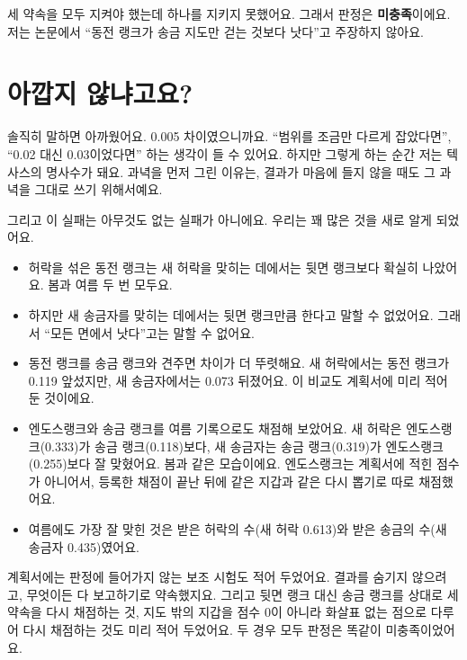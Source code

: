 세 약속을 모두 지켜야 했는데 하나를 지키지 못했어요.
그래서 판정은 \textbf{미충족}이에요.
저는 논문에서 “동전 랭크가 송금 지도만 걷는 것보다 낫다”고 주장하지 않아요.

\section{아깝지 않냐고요?}

솔직히 말하면 아까웠어요.
0.005 차이였으니까요.
“범위를 조금만 다르게 잡았다면”, “0.02 대신 0.03이었다면” 하는 생각이 들 수 있어요.
하지만 그렇게 하는 순간 저는 텍사스의 명사수가 돼요.
과녁을 먼저 그린 이유는, 결과가 마음에 들지 않을 때도 그 과녁을 그대로 쓰기 위해서예요.

그리고 이 실패는 아무것도 없는 실패가 아니에요.
우리는 꽤 많은 것을 새로 알게 되었어요.

\begin{itemize}
\item 허락을 섞은 동전 랭크는 새 허락을 맞히는 데에서는 뒷면 랭크보다 확실히 나았어요. 봄과 여름 두 번 모두요.
\item 하지만 새 송금자를 맞히는 데에서는 뒷면 랭크만큼 한다고 말할 수 없었어요. 그래서 “모든 면에서 낫다”고는 말할 수 없어요.
\item 동전 랭크를 송금 랭크와 견주면 차이가 더 뚜렷해요. 새 허락에서는 동전 랭크가 0.119 앞섰지만, 새 송금자에서는 0.073 뒤졌어요.
      이 비교도 계획서에 미리 적어 둔 것이에요.
\item 엔도스랭크와 송금 랭크를 여름 기록으로도 채점해 보았어요.
      새 허락은 엔도스랭크(0.333)가 송금 랭크(0.118)보다, 새 송금자는 송금 랭크(0.319)가 엔도스랭크(0.255)보다 잘 맞혔어요. 봄과 같은 모습이에요.
      엔도스랭크는 계획서에 적힌 점수가 아니어서, 등록한 채점이 끝난 뒤에 같은 지갑과 같은 다시 뽑기로 따로 채점했어요.
\item 여름에도 가장 잘 맞힌 것은 받은 허락의 수(새 허락 0.613)와 받은 송금의 수(새 송금자 0.435)였어요.
\end{itemize}

계획서에는 판정에 들어가지 않는 보조 시험도 적어 두었어요.
결과를 숨기지 않으려고, 무엇이든 다 보고하기로 약속했지요.
그리고 뒷면 랭크 대신 송금 랭크를 상대로 세 약속을 다시 채점하는 것,
지도 밖의 지갑을 점수 0이 아니라 화살표 없는 점으로 다루어 다시 채점하는 것도 미리 적어 두었어요.
두 경우 모두 판정은 똑같이 미충족이었어요.

